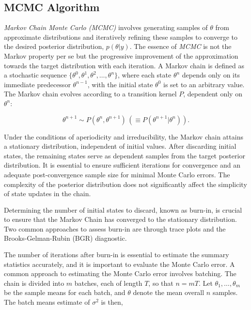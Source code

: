 \documentclass[
  11pt,
]{article}
\begin{document}
\subsection{MCMC Algorithm}

\emph{Markov Chain Monte Carlo (MCMC)} involves generating samples of
\(\theta\) from approximate distributions and iteratively refining these
samples to converge to the desired posterior distribution,
\(p(\theta|y)\). The essence of \emph{MCMC} is not the Markov property
per se but the progressive improvement of the approximation towards the
target distribution with each iteration. A Markov chain is defined as a
stochastic sequence
\(\{\theta^0, \theta^1, \theta^2, \ldots, \theta^n\}\), where each state
\(\theta^n\) depends only on its immediate predecessor \(\theta^{n-1}\),
with the initial state \(\theta^0\) is set to an arbitrary value. The
Markov chain evolves according to a transition kernel \(P\), dependent
only on \(\theta^n\):

\begin{equation}
\theta^{n+1} \sim P(\theta^n, \theta^{n+1}) \, (\equiv P(\theta^{n+1}|\theta^n)).
\end{equation}

Under the conditions of aperiodicity and irreducibility, the Markov
chain attains a stationary distribution, independent of initial values.
After discarding initial states, the remaining states serve as dependent
samples from the target posterior distribution. It is essential to
ensure sufficient iterations for convergence and an adequate
post-convergence sample size for minimal Monte Carlo errors. The
complexity of the posterior distribution does not significantly affect
the simplicity of state updates in the chain.

Determining the number of initial states to discard, known as burn-in,
is crucial to ensure that the Markov Chain has converged to the
stationary distribution. Two common approaches to assess burn-in are
through trace plots and the Brooks-Gelman-Rubin (BGR) diagnostic.

The number of iterations after burn-in is essential to estimate the
summary statistics accurately, and it is important to evaluate the Monte
Carlo error. A common approach to estimating the Monte Carlo error
involves batching. The chain is divided into \(m\) batches, each of
length \(T\), so that \(n = mT\). Let \(\theta_1,\ldots,\theta_m\) be
the sample means for each batch, and \(\theta\) denote the mean overall
\(n\) samples. The batch means estimate of \(\sigma^2\) is then,
\end{document}

